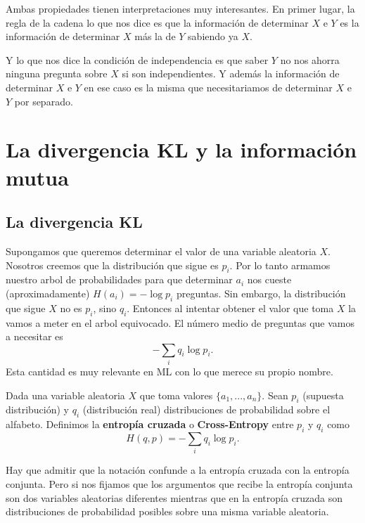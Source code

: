 Ambas propiedades tienen interpretaciones muy interesantes. En primer lugar, la regla de la cadena lo que nos dice es que la informaci\'on de determinar $X$ e $Y$ es la informaci\'on de determinar $X$ m\'as la de $Y$ sabiendo ya $X$. 

Y lo que nos dice la condici\'on de independencia es que saber $Y$ no nos ahorra ninguna pregunta sobre $X$ si son independientes. Y adem\'as la informaci\'on de determinar $X$ e $Y$ en ese caso es la misma que necesitariamos de determinar $X$ e $Y$ por separado.


\section{La divergencia KL y la informaci\'on mutua}
\subsection{La divergencia KL}
Supongamos que queremos determinar el valor de una variable aleatoria $X$. Nosotros creemos que la distribuci\'on que sigue es $p_i$. Por lo tanto armamos nuestro arbol de probabilidades para que determinar $a_i$ nos cueste (aproximadamente) $H(a_i)=-\log p_i$ preguntas. Sin embargo, la distribuci\'on que sigue $X$ no es $p_i$, sino $q_i$. Entonces al intentar obtener el valor que toma $X$ la vamos a meter en el arbol equivocado. El n\'umero medio de preguntas que vamos a necesitar es 
$$
    -\sum_i q_i \log p_i.
$$
Esta cantidad es muy relevante en ML con lo que merece su propio nombre.
\begin{definition}
    Dada una variable aleatoria $X$ que toma valores $\{a_1,...,a_n\}$. Sean $p_i$ (supuesta distribuci\'on) y $q_i$ (distribuci\'on real) distribuciones de probabilidad sobre el alfabeto. Definimos la {\bf entrop\'ia cruzada} o {\bf Cross-Entropy} entre $p_i$ y $q_i$ como
    \begin{equation}
        H(q,p) = -\sum_i q_i \log p_i.    
    \end{equation}
\end{definition}

Hay que admitir que la notaci\'on confunde a la entrop\'ia cruzada con la entrop\'ia conjunta. Pero si nos fijamos que los argumentos que recibe la entrop\'ia conjunta son dos variables aleatorias diferentes mientras que en la entrop\'ia cruzada son distribuciones de probabilidad posibles sobre una misma variable aleatoria.

